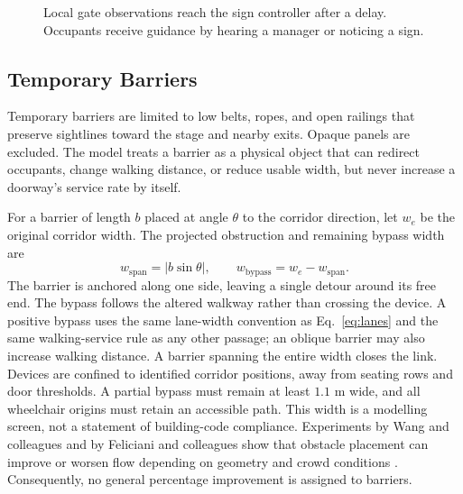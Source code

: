 \documentclass[11pt,a4paper]{article}
\begin{document}
\begin{figure}[htbp]
\centering
{}
\caption{Local gate observations reach the sign controller after a delay. Occupants receive guidance by hearing a manager or noticing a sign.}
\label{fig:information}
\end{figure}

\subsection{Temporary Barriers}

Temporary barriers are limited to low belts, ropes, and open railings that preserve sightlines toward the stage and nearby exits. Opaque panels are excluded. The model treats a barrier as a physical object that can redirect occupants, change walking distance, or reduce usable width, but never increase a doorway's service rate by itself.

For a barrier of length $b$ placed at angle $\theta$ to the corridor direction, let $w_e$ be the original corridor width. The projected obstruction and remaining bypass width are
\begin{equation}\label{eq:barrier}
w_{\mathrm{span}}=|b\sin\theta|,\qquad
w_{\mathrm{bypass}}=w_e-w_{\mathrm{span}}.
\end{equation}
The barrier is anchored along one side, leaving a single detour around its free end. The bypass follows the altered walkway rather than crossing the device. A positive bypass uses the same lane-width convention as Eq.~\eqref{eq:lanes} and the same walking-service rule as any other passage; an oblique barrier may also increase walking distance.
A barrier spanning the entire width closes the link. Devices are confined to identified corridor positions, away from seating rows and door thresholds. A partial bypass must remain at least $1.1$ m wide, and all wheelchair origins must retain an accessible path. This width is a modelling screen, not a statement of building-code compliance. Experiments by Wang and colleagues and by Feliciani and colleagues show that obstacle placement can improve or worsen flow depending on geometry and crowd conditions \cite{wang,feliciani,chen}. Consequently, no general percentage improvement is assigned to barriers.
\end{document}
